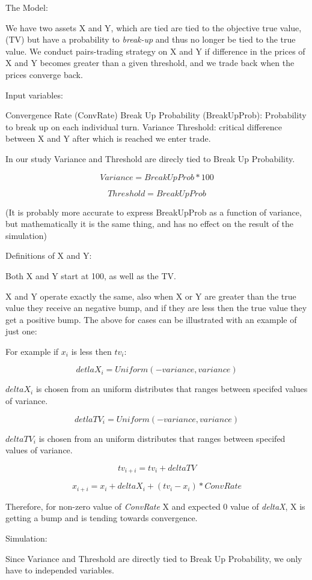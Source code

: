 \documentclass[11pt]{report}
\begin{document}
The Model:

We have two assets X and Y, which are tied are tied to the objective true value, (TV) but have a probability to  \textit{break-up} and thus no longer be tied to the true value. We conduct pairs-trading strategy on X and Y if difference in the prices of X and Y becomes greater than a given threshold, and we trade back when the prices converge back.

Input variables:

Convergence Rate (ConvRate)
Break Up Probability (BreakUpProb): Probability to break up on each individual turn.
Variance
Threshold: critical difference between X and Y after which is reached we enter trade.

In our study Variance and Threshold are direcly tied to Break Up Probability.

\begin{equation}
Variance = BreakUpProb * 100
\end{equation}

\begin{equation}
Threshold = BreakUpProb
\end{equation}

(It is probably more accurate to express BreakUpProb as a function of variance, but mathematically it is the same thing, and has no effect on the result of the simulation)

Definitions of X and Y:

Both X and Y start at 100, as well as the TV. 

X and Y operate exactly the same, also when X or Y are greater than the true value they receive an negative bump, and if they are less then the true value they get a positive bump. The above for cases can be illustrated with an example of just one:

For example if $x_i$ is less then $tv_i$:

\begin{equation}
detlaX_i = Uniform(-variance, variance)
\end{equation}

$deltaX_i$ is chosen from an uniform distributes that ranges between specifed values of variance.

\begin{equation}
detlaTV_i = Uniform(-variance, variance)
\end{equation}

$deltaTV_i$ is chosen from an uniform distributes that ranges between specifed values of variance.

\begin{equation}
tv_{i+i} = tv_i + deltaTV
\end{equation}


\begin{equation}
x_{i+i} = x_i + deltaX_{i} + (tv_i - x_i) * ConvRate
\end{equation}

Therefore, for non-zero value of \textit{ConvRate} X and expected 0 value of \textit{deltaX}, X is getting a bump and is tending towards convergence. 

Simulation:

Since Variance and Threshold are directly tied to Break Up Probability, we only have to independed variables. 
\end{document}

